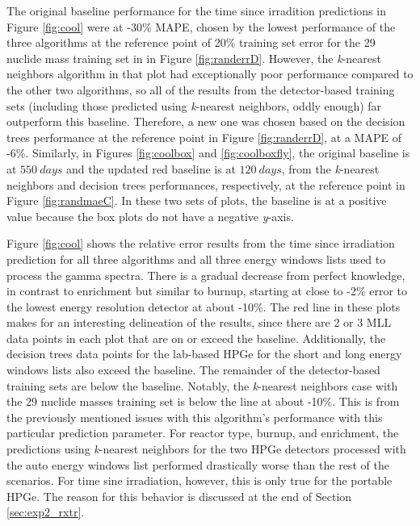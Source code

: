The original baseline performance for the time since irradition predictions in
Figure \ref{fig:cool} were at -30\% \gls{MAPE}, chosen by the lowest
performance of the three algorithms at the reference point of 20\% training set
error for the 29 nuclide mass training set in in Figure \ref{fig:randerrD}.
However, the \textit{k}-nearest neighbors algorithm in that plot had
exceptionally poor performance compared to the other two algorithms, so all of
the results from the detector-based training sets (including those predicted
using \textit{k}-nearest neighbors, oddly enough) far outperform this baseline.
Therefore, a new one was chosen based on the decision trees performance at the
reference point in Figure \ref{fig:randerrD}, at a \gls{MAPE} of -6\%.
Similarly, in Figures \ref{fig:coolbox} and \ref{fig:coolboxfly}, the original
baseline is at $550\:days$ and the updated red baseline is at $120\:days$, from
the \textit{k}-nearest neighbors and decision trees performances, respectively,
at the reference point in Figure \ref{fig:randmaeC}.  In these two sets of
plots, the baseline is at a positive value because the box plots do not have a
negative \textit{y}-axis. 

Figure \ref{fig:cool} shows the relative error results from the time since
irradiation prediction for all three algorithms and all three energy windows
lists used to process the gamma spectra. There is a gradual decrease from
perfect knowledge, in contrast to enrichment but similar to burnup, starting at
close to -2\% error to the lowest energy resolution detector at about -10\%.
The red line in these plots makes for an interesting delineation of the
results, since there are 2 or 3 \gls{MLL} data points in each plot that are on
or exceed the baseline.  Additionally, the decision trees data points for the
lab-based \gls{HPGe} for the short and long energy windows lists also exceed
the baseline. The remainder of the detector-based training sets are below the
baseline.  Notably, the \textit{k}-nearest neighbors case with the 29 nuclide
masses training set is below the line at about -10\%.  This is from the
previously mentioned issues with this algorithm's performance with this
particular prediction parameter.  For reactor type, burnup, and enrichment, the
predictions using \textit{k}-nearest neighbors for the two \gls{HPGe} detectors
processed with the auto energy windows list performed drastically worse than
the rest of the scenarios. For time sine irradiation, however, this is only
true for the portable \gls{HPGe}.  The reason for this behavior is discussed at
the end of Section \ref{sec:exp2_rxtr}. 

